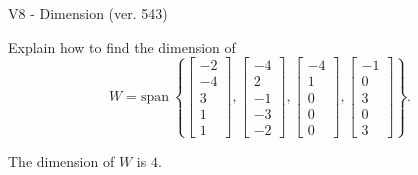 \begin{exercise}
  \begin{exerciseTitle}V8 - Dimension (ver. 543)\end{exerciseTitle}
  \begin{exerciseStatement}
    Explain how to find the dimension of 
\[W=\mathrm{span}\ \left\{\left[\begin{array}{r}
-2 \\
-4 \\
3 \\
1 \\
1
\end{array}\right] , \left[\begin{array}{r}
-4 \\
2 \\
-1 \\
-3 \\
-2
\end{array}\right] , \left[\begin{array}{r}
-4 \\
1 \\
0 \\
0 \\
0
\end{array}\right] , \left[\begin{array}{r}
-1 \\
0 \\
3 \\
0 \\
3
\end{array}\right]\right\}.\]



  \end{exerciseStatement}
  \begin{exerciseAnswer}
   The dimension of \(W\) is  \(4\).
  


  \end{exerciseAnswer}
\end{exercise}